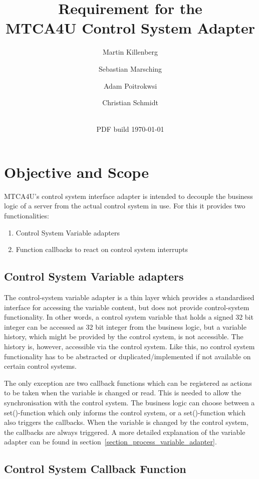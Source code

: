 \documentclass[11pt,a4paper]{scrartcl}
\title{Requirement for the\\ MTCA4U Control System Adapter}
\date{\svnrevision\\ PDF build \today}
\author[1]{Martin Killenberg} \author[2]{Sebastian Marsching}
\author[3]{Adam Poitrokwsi}
\author[1]{Christian Schmidt}
\affil[1]{Deutsches Elektronen-Synchrotron DESY, Hamburg, Germany}
\affil[2]{aquenos GmbH, Baden-Baden, Germany}
\affil[3]{FastLogic Sp.\ z o.\ o., \L\'od\'z, Poland}
\begin{document}
\maketitle
\section{Objective and Scope}

MTCA4U's control system interface adapter is intended to decouple the business
logic of a server from the actual control system in use. For this it provides
two functionalities: 
\begin{enumerate}
  \item Control System Variable adapters
  \item Function callbacks to react on control system interrupts
\end{enumerate}

\subsection{Control System Variable adapters}

The control-system variable adapter is a thin layer which provides a
standardised interface for accessing the variable content, but does not provide
control-system functionality. In other words, a control system variable that
holds a signed 32 bit integer can be accessed as 32 bit integer from the
business logic, but a variable history, which might be provided by the control
system, is not accessible. The history is, however, accessible via the control
system. Like this, no control system functionality has to be abstracted or
duplicated/implemented if not available on certain control systems. 

The only exception are two callback functions which can be registered as
actions to be taken when the variable is changed or read. This is needed to allow the
synchronisation with the control system. The business logic can choose between
a set()-function which only informs the control system, or a set()-function
which also triggers the callbacks. When the variable is changed by the control
system, the callbacks are always triggered. A more detailed explanation of the
variable adapter can be found in
section~\ref{section_process_variable_adapter}. 

\subsection{Control System Callback Function}
\end{document}
